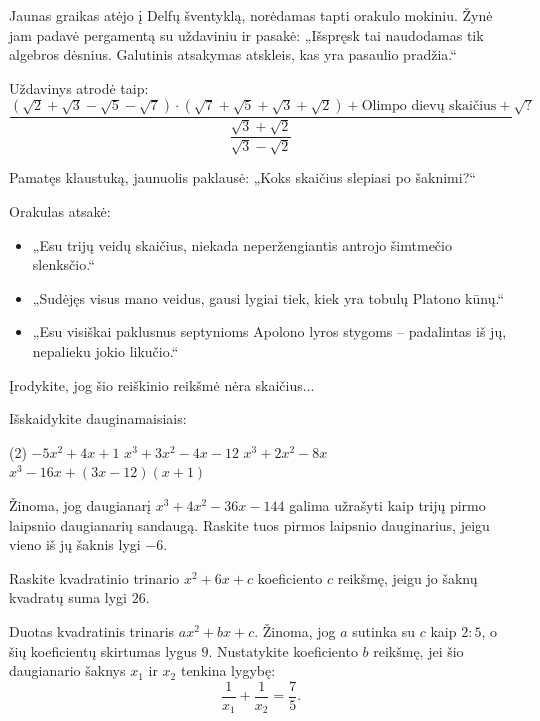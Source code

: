 \documentclass[12pt, a4paper]{scrartcl}
\begin{document}
\begin{problem}
Jaunas graikas atėjo į Delfų šventyklą, norėdamas tapti orakulo mokiniu.
Žynė jam padavė pergamentą su uždaviniu ir pasakė: „Išspręsk tai
naudodamas tik algebros dėsnius. Galutinis atsakymas atskleis, kas yra
pasaulio pradžia.“

Uždavinys atrodė taip:
\[
\frac{
(\sqrt{2}+\sqrt{3}-\sqrt{5}-\sqrt{7})
\cdot
(\sqrt{7}+\sqrt{5}+\sqrt{3}+\sqrt{2})
+\text{Olimpo dievų skaičius}+\sqrt{?}
}{
\dfrac{\sqrt{3}+\sqrt{2}}{\sqrt{3}-\sqrt{2}}
}
\]

Pamatęs klaustuką, jaunuolis paklausė: „Koks skaičius slepiasi po šaknimi?“

Orakulas atsakė:
\begin{itemize}
    \item „Esu trijų veidų skaičius, niekada neperžengiantis antrojo
    šimtmečio slenksčio.“
    \item „Sudėjęs visus mano veidus, gausi lygiai tiek, kiek yra tobulų
    Platono kūnų.“
    \item „Esu visiškai paklusnus septynioms Apolono lyros stygoms –
    padalintas iš jų, nepalieku jokio likučio.“
\end{itemize}

Įrodykite, jog šio reiškinio reikšmė nėra skaičius...
\end{problem}

\begin{problem}
Išskaidykite dauginamaisiais:
\begin{tasks}(2)
    \task $-5x ^{2} +4x +1$ 
    \task $x ^{3} + 3x ^{2} - 4x - 12$
    \task $x ^{3} +2x ^{2} -8x$
    \task $x ^{3}-16 x  + (3x-12)(x+1)$   
\end{tasks}
\end{problem}

\begin{problem}
    Žinoma, jog  daugianarį $x^3+4 x^2-36 x-144$ galima užrašyti kaip trijų pirmo laipsnio daugianarių sandaugą. Raskite tuos pirmos laipsnio dauginarius, jeigu vieno iš jų šaknis lygi $-6$.
\end{problem}

\begin{problem}
    Raskite kvadratinio trinario $x ^{2} +6x+c$ koeficiento $c$ reikšmę, jeigu jo šaknų kvadratų suma lygi $26$.   
\end{problem}

\begin{problem}
Duotas kvadratinis trinaris $ax ^{2} +bx+c$. Žinoma, jog $a$ sutinka su $c$ kaip $2 : 5$, o šių koeficientų skirtumas lygus $9$. Nustatykite koeficiento $b$ reikšmę, jei šio daugianario šaknys $x_1$ ir $x_2$ tenkina lygybę:
$$ \frac{1}{x_1} + \frac{1}{x_2} = \frac75.  $$           
\end{problem}
\end{document}
